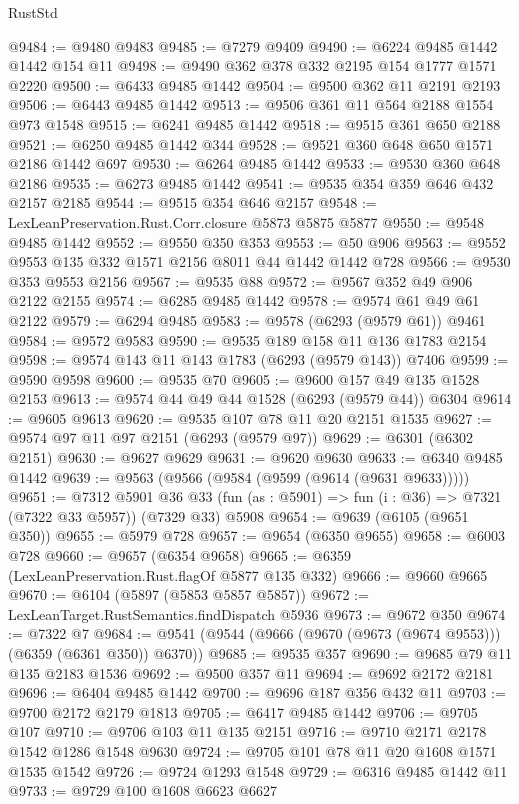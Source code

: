 \begin{lexlean}{RustStd}
\begin{coremodule}
{\begin{coremodule}
{{{{{{{{{{{{{{{{{{{{{{{{{{{{{{{{{{{@9484 := @9480 @9483
@9485 := @7279 @9409
@9490 := @6224 @9485 @1442 @1442 @154 @11
@9498 := @9490 @362 @378 @332 @2195 @154 @1777 @1571 @2220
@9500 := @6433 @9485 @1442
@9504 := @9500 @362 @11 @2191 @2193
@9506 := @6443 @9485 @1442
@9513 := @9506 @361 @11 @564 @2188 @1554 @973 @1548
@9515 := @6241 @9485 @1442
@9518 := @9515 @361 @650 @2188
@9521 := @6250 @9485 @1442 @344
@9528 := @9521 @360 @648 @650 @1571 @2186 @1442 @697
@9530 := @6264 @9485 @1442
@9533 := @9530 @360 @648 @2186
@9535 := @6273 @9485 @1442
@9541 := @9535 @354 @359 @646 @432 @2157 @2185
@9544 := @9515 @354 @646 @2157
@9548 := LexLeanPreservation.Rust.Corr.closure @5873 @5875 @5877
@9550 := @9548 @9485 @1442
@9552 := @9550 @350 @353
@9553 := @50 @906
@9563 := @9552 @9553 @135 @332 @1571 @2156 @8011 @44 @1442 @1442 @728
@9566 := @9530 @353 @9553 @2156
@9567 := @9535 @88
@9572 := @9567 @352 @49 @906 @2122 @2155
@9574 := @6285 @9485 @1442
@9578 := @9574 @61 @49 @61 @2122
@9579 := @6294 @9485
@9583 := @9578 (@6293 (@9579 @61)) @9461
@9584 := @9572 @9583
@9590 := @9535 @189 @158 @11 @136 @1783 @2154
@9598 := @9574 @143 @11 @143 @1783 (@6293 (@9579 @143)) @7406
@9599 := @9590 @9598
@9600 := @9535 @70
@9605 := @9600 @157 @49 @135 @1528 @2153
@9613 := @9574 @44 @49 @44 @1528 (@6293 (@9579 @44)) @6304
@9614 := @9605 @9613
@9620 := @9535 @107 @78 @11 @20 @2151 @1535
@9627 := @9574 @97 @11 @97 @2151 (@6293 (@9579 @97))
@9629 := @6301 (@6302 @2151)
@9630 := @9627 @9629
@9631 := @9620 @9630
@9633 := @6340 @9485 @1442
@9639 := @9563 (@9566 (@9584 (@9599 (@9614 (@9631 @9633)))))
@9651 := @7312
    @5901
    @36
    @33
    (fun (as : @5901) => fun (i : @36) => @7321 (@7322 @33 @5957))
    (@7329 @33)
    @5908
@9654 := @9639 (@6105 (@9651 @350))
@9655 := @5979 @728
@9657 := @9654 (@6350 @9655)
@9658 := @6003 @728
@9660 := @9657 (@6354 @9658)
@9665 := @6359 (LexLeanPreservation.Rust.flagOf @5877 @135 @332)
@9666 := @9660 @9665
@9670 := @6104 (@5897 (@5853 @5857 @5857))
@9672 := LexLeanTarget.RustSemantics.findDispatch @5936
@9673 := @9672 @350
@9674 := @7322 @7
@9684 := @9541 (@9544 (@9666 (@9670 (@9673 (@9674 @9553))) (@6359 (@6361 @350)) @6370))
@9685 := @9535 @357
@9690 := @9685 @79 @11 @135 @2183 @1536
@9692 := @9500 @357 @11
@9694 := @9692 @2172 @2181
@9696 := @6404 @9485 @1442
@9700 := @9696 @187 @356 @432 @11
@9703 := @9700 @2172 @2179 @1813
@9705 := @6417 @9485 @1442
@9706 := @9705 @107
@9710 := @9706 @103 @11 @135 @2151
@9716 := @9710 @2171 @2178 @1542 @1286 @1548 @9630
@9724 := @9705 @101 @78 @11 @20 @1608 @1571 @1535 @1542
@9726 := @9724 @1293 @1548
@9729 := @6316 @9485 @1442 @11
@9733 := @9729 @100 @1608 @6623 @6627
}}}}}}}}}}}}}}}}}}}}}}}}}}}}}}}}}}}
\end{coremodule}}
\end{coremodule}
\end{lexlean}
